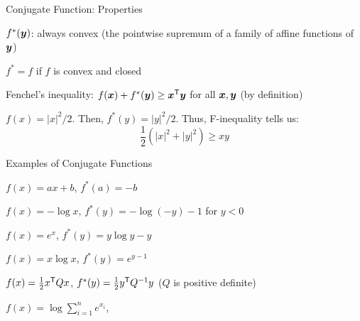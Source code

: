 \documentclass[handout,fleqn,aspectratio=169]{beamer}
\begin{document}
\begin{frame}{Conjugate Function: Properties}

\plitemsep 0.1in

\bci 

\item 
{}

\item $f^{*}(\bm{y})$:  {\red always convex} (the pointwise
supremum of a family of affine functions of $\bm{y}$)

\item $f^{*}=f$ if $f$ is convex and closed

\item {\blue Fenchel's inequality}: $f(\bm{x})+f^{*}(\bm{y})\geq {\bm{x}}^{\mathsf{T}} \bm{y}$
for all $\bm{x},\bm{y}$ (by definition)
\bci
\item \exam $f(x) = |x|^2/2$. Then, $f^*(y) = |y|^2/2.$ Thus, F-inequality tells us: 
$$
\frac{1}{2}(|x|^2 + |y|^2) \ge xy
$$
\eci

\eci
\end{frame}

\begin{frame}{Examples of Conjugate Functions}

\plitemsep 0.1in

\bci 

\item $f(x)=ax+b$, $f^{*}(a)=-b$

\item $f(x)=-\log x$, $f^{*}(y)=-\log(-y)-1$ for $y<0$

\item $f(x)=e^{x}$, $f^{*}(y)=y\log y-y$

\item $f(x)=x\log x$, $f^{*}(y)=e^{y-1}$

\item $f(x)=\frac{1}{2}{x}^{\mathsf{T}}Qx$,
$f^{*}(y)=\frac{1}{2}{y}^{\mathsf{T}}Q^{-1}y$ ($Q$ is positive definite)

\item $f(x)=\log\sum_{i=1}^{n}e^{x_{i}}$,

\eci
\end{frame}
\end{document}
